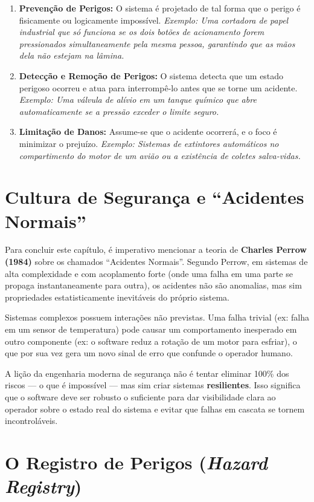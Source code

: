 \documentclass[12pt,a4paper,twoside]{report}
\begin{document}
\begin{enumerate}
    \item \textbf{Prevenção de Perigos:} O sistema é projetado de tal forma que o perigo é fisicamente ou logicamente impossível.
    \textit{Exemplo: Uma cortadora de papel industrial que só funciona se os dois botões de acionamento forem pressionados simultaneamente pela mesma pessoa, garantindo que as mãos dela não estejam na lâmina.}
    \item \textbf{Detecção e Remoção de Perigos:} O sistema detecta que um estado perigoso ocorreu e atua para interrompê-lo antes que se torne um acidente.
    \textit{Exemplo: Uma válvula de alívio em um tanque químico que abre automaticamente se a pressão exceder o limite seguro.}
    \item \textbf{Limitação de Danos:} Assume-se que o acidente ocorrerá, e o foco é minimizar o prejuízo.
    \textit{Exemplo: Sistemas de extintores automáticos no compartimento do motor de um avião ou a existência de coletes salva-vidas.}
\end{enumerate}

\section{Cultura de Segurança e ``Acidentes Normais''}

Para concluir este capítulo, é imperativo mencionar a teoria de \textbf{Charles Perrow (1984)} sobre os chamados ``Acidentes Normais''. Segundo Perrow, em sistemas de alta complexidade e com acoplamento forte (onde uma falha em uma parte se propaga instantaneamente para outra), os acidentes não são anomalias, mas sim propriedades estatisticamente inevitáveis do próprio sistema.

Sistemas complexos possuem interações não previstas. Uma falha trivial (ex: falha em um sensor de temperatura) pode causar um comportamento inesperado em outro componente (ex: o software reduz a rotação de um motor para esfriar), o que por sua vez gera um novo sinal de erro que confunde o operador humano.

A lição da engenharia moderna de segurança não é tentar eliminar 100\% dos riscos --- o que é impossível --- mas sim criar sistemas \textbf{resilientes}. Isso significa que o software deve ser robusto o suficiente para dar visibilidade clara ao operador sobre o estado real do sistema e evitar que falhas em cascata se tornem incontroláveis.

\section{O Registro de Perigos (\textit{Hazard Registry})}
\end{document}
